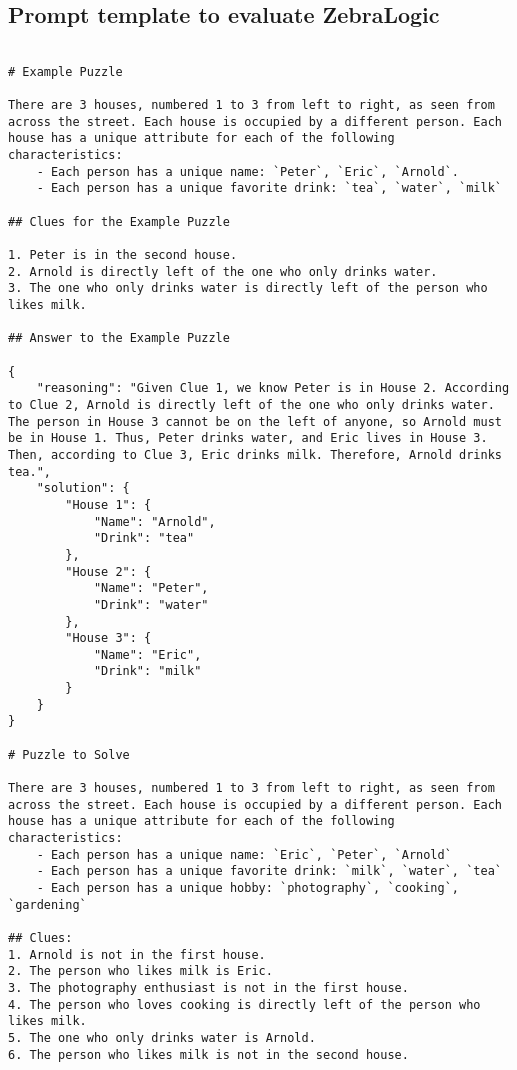 \subsection{Prompt template to evaluate ZebraLogic} 
\label{app:prompt_template}
\begin{Verbatim}[breaklines=true, 
    breakanywhere=true,
    fontsize=\small,
    baselinestretch=0.65,
    frame=single,
    commandchars=none]

# Example Puzzle 

There are 3 houses, numbered 1 to 3 from left to right, as seen from across the street. Each house is occupied by a different person. Each house has a unique attribute for each of the following characteristics:
    - Each person has a unique name: `Peter`, `Eric`, `Arnold`.
    - Each person has a unique favorite drink: `tea`, `water`, `milk`

## Clues for the Example Puzzle

1. Peter is in the second house.
2. Arnold is directly left of the one who only drinks water.
3. The one who only drinks water is directly left of the person who likes milk.

## Answer to the Example Puzzle

{
    "reasoning": "Given Clue 1, we know Peter is in House 2. According to Clue 2, Arnold is directly left of the one who only drinks water. The person in House 3 cannot be on the left of anyone, so Arnold must be in House 1. Thus, Peter drinks water, and Eric lives in House 3. Then, according to Clue 3, Eric drinks milk. Therefore, Arnold drinks tea.",
    "solution": {
        "House 1": {
            "Name": "Arnold",
            "Drink": "tea"
        },
        "House 2": {
            "Name": "Peter",
            "Drink": "water"
        },
        "House 3": {
            "Name": "Eric",
            "Drink": "milk"
        }
    }
}

# Puzzle to Solve 

There are 3 houses, numbered 1 to 3 from left to right, as seen from across the street. Each house is occupied by a different person. Each house has a unique attribute for each of the following characteristics:
    - Each person has a unique name: `Eric`, `Peter`, `Arnold`
    - Each person has a unique favorite drink: `milk`, `water`, `tea`
    - Each person has a unique hobby: `photography`, `cooking`, `gardening`

## Clues:
1. Arnold is not in the first house.
2. The person who likes milk is Eric.
3. The photography enthusiast is not in the first house.
4. The person who loves cooking is directly left of the person who likes milk.
5. The one who only drinks water is Arnold.
6. The person who likes milk is not in the second house.




\end{Verbatim}
